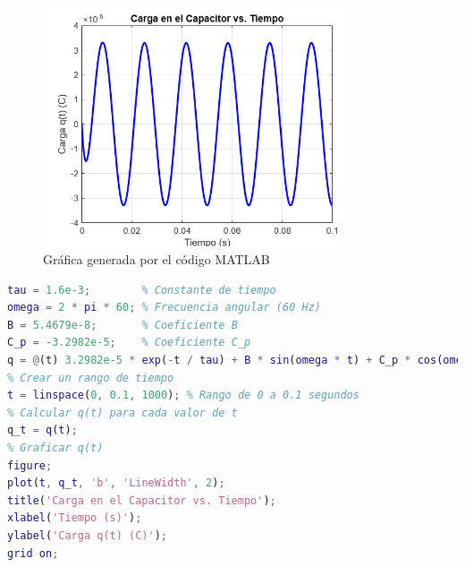 \begin{figure}[H]
    \centering
    \includegraphics[width=0.8\textwidth]{6.png}
    \caption{Gráfica generada por el código MATLAB}
\end{figure}

\begin{lstlisting}[language=Matlab, caption={Código MATLAB para simulación de carga}, label={cod:matlab}, frame=single, basicstyle=\footnotesize\ttfamily]
tau = 1.6e-3;        % Constante de tiempo
omega = 2 * pi * 60; % Frecuencia angular (60 Hz)
B = 5.4679e-8;       % Coeficiente B
C_p = -3.2982e-5;    % Coeficiente C_p
q = @(t) 3.2982e-5 * exp(-t / tau) + B * sin(omega * t) + C_p * cos(omega * t);
% Crear un rango de tiempo
t = linspace(0, 0.1, 1000); % Rango de 0 a 0.1 segundos
% Calcular q(t) para cada valor de t
q_t = q(t);
% Graficar q(t)
figure;
plot(t, q_t, 'b', 'LineWidth', 2);
title('Carga en el Capacitor vs. Tiempo');
xlabel('Tiempo (s)');
ylabel('Carga q(t) (C)');
grid on;
\end{lstlisting}